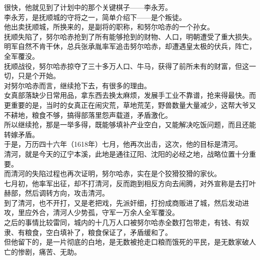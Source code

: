 \begin{multicols}{\theparacolNo}
很快，他就见到了计划中的那个关键棋子——李永芳。\\

李永芳，是抚顺城的守将之一，简单介绍下——是个叛徒。\\

他出卖抚顺城，所换来的，是副将的职称，和努尔哈赤的一个孙女。\\

抚顺失陷了，努尔哈赤抢到了所有能够抢到的财物、人口，明朝遭受了重大损失。\\

明军自然不肯干休，总兵张承胤率军追击努尔哈赤，却遭遇皇太极的伏兵，阵亡，全军覆没。\\

抚顺战役，努尔哈赤掠夺了三十多万人口、牛马，获得了前所未有的财富，但这一切，只是个开始。\\

对努尔哈赤而言，继续抢下去，有很多的理由。\\

女真部落缺少日常用品，拿东西去换太麻烦，发展手工业不靠谱，抢来得最快。而更重要的是，当时的女真正在闹灾荒，草地荒芜，野兽数量大量减少，这帮大爷又不耕地，粮食不够，搞得部落里怨声载道，矛盾激化。\\

所以继续抢，那是一举多得，既能够填补产业空白，又能解决吃饭问题，而且还能转嫁矛盾。\\

于是，万历四十六年（1618年）七月，他再次出击，这次，他的目标是清河。\\

清河，就是今天的辽宁本溪，此地是通往辽阳、沈阳的必经之地，战略位置十分重要。\\

而清河的失陷过程也再次证明，努尔哈赤，实在是个狡猾狡猾的家伙。\\

七月初，他率军出征，却不打清河，反而跑到相反方向去闹腾，对外宣称是去打叶赫部，然后调转方向，攻击清河。\\

到了清河，也不开打，又是老把戏，先派奸细，打扮成商贩进了城，然后发动进攻，里应外合，清河人少势孤，守军一万余人全军覆没。\\

之后的事情比较雷同，城内的十几万人口被努尔哈赤全数打包带走，有钱、有奴隶、有粮食，空白填补了，粮食保证了，矛盾缓和了。\\

但他留下的，是一片彻底的白地，是无数被抢走口粮而饿死的平民，是无数家破人亡的惨剧，痛苦、无助。\\


\end{multicols}
